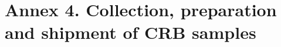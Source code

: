 \documentclass[twocolumn,letterpaper]{scrartcl}
\begin{document}
\section{Annex 4.  Collection, preparation and shipment of CRB samples}  
% 
%
%
% 
%
% 
%
%
%
%
%
%
%
%
%
%
%
%
%
%
%
%
%
%
%
%
%
%
%
%
%
%
%
%
%
%
%
%
%
%
%
%
%
%
%
%
%
%
%
%
%
%
%
%
%
%
%
\end{document}
